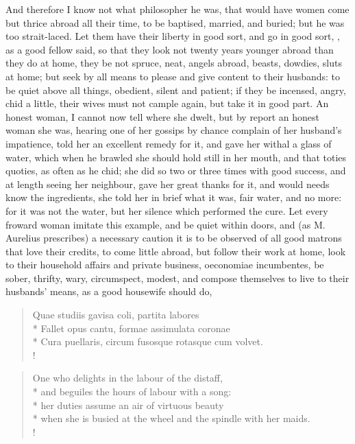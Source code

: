 And therefore I know not what philosopher he was, that would have women
come but thrice abroad all their time, to be baptised, married,
and buried; but he was too strait-laced. Let them have their liberty in
good sort, and go in good sort, , as a good fellow said, so that they look not twenty
years younger abroad than they do at home, they be not spruce, neat,
angels abroad, beasts, dowdies, sluts at home; but seek by all means to
please and give content to their husbands: to be quiet above all
things, obedient, silent and patient; if they be incensed, angry, chid
a little, their wives must not cample again, but take it in good
part. An honest woman, I cannot now tell where she dwelt, but by report
an honest woman she was, hearing one of her gossips by chance complain
of her husband's impatience, told her an excellent remedy for it, and
gave her withal a glass of water, which when he brawled she should hold
still in her mouth, and that toties quoties, as often as he chid; she
did so two or three times with good success, and at length seeing her
neighbour, gave her great thanks for it, and would needs know the
ingredients, she told her in brief what it was, fair water, and
no more: for it was not the water, but her silence which performed the
cure. Let every froward woman imitate this example, and be quiet within
doors, and (as M. Aurelius prescribes) a necessary caution it is
to be observed of all good matrons that love their credits, to come
little abroad, but follow their work at home, look to their household
affairs and private business, oeconomiae incumbentes, be sober,
thrifty, wary, circumspect, modest, and compose themselves to live to
their husbands' means, as a good housewife should do,
%
\begin{latin}
\begin{verse}%
Quae studiis gavisa coli, partita labores\\*
Fallet opus cantu, formae assimulata coronae\\*
Cura puellaris, circum fusosque rotasque cum volvet.\\!
\end{verse}%
\end{latin}
\translationrule%
\begin{verse}%
One who delights in the labour of the distaff,\\*
and beguiles the hours of labour with a song:\\*
her duties assume an air of virtuous beauty\\*
when she is busied at the wheel and the spindle with her maids.\\!
\end{verse}
%

